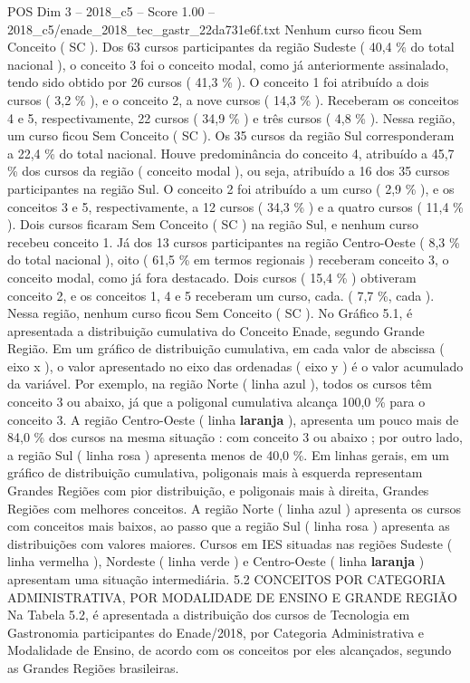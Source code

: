 \begin{textsample}{POS Dim 3 – 2018\_c5 – Score 1.00 – 2018\_c5/enade\_2018\_tec\_gastr\_22da731e6f.txt}
Nenhum curso ficou Sem Conceito ( SC ).
Dos 63 cursos participantes da região Sudeste ( 40,4 \% do total nacional ), o conceito 3 foi o conceito modal, como já anteriormente assinalado, tendo sido obtido por 26 cursos ( 41,3 \% ).
O conceito 1 foi atribuído a dois cursos ( 3,2 \% ), e o conceito 2, a nove cursos ( 14,3 \% ).
Receberam os conceitos 4 e 5, respectivamente, 22 cursos ( 34,9 \% ) e três cursos ( 4,8 \% ).
Nessa região, um curso ficou Sem Conceito ( SC ).
Os 35 cursos da região Sul corresponderam a 22,4 \% do total nacional.
Houve predominância do conceito 4, atribuído a 45,7 \% dos cursos da região ( conceito modal ), ou seja, atribuído a 16 dos 35 cursos participantes na região Sul.
O conceito 2 foi atribuído a um curso ( 2,9 \% ), e os conceitos 3 e 5, respectivamente, a 12 cursos ( 34,3 \% ) e a quatro cursos ( 11,4 \% ).
Dois cursos ficaram Sem Conceito ( SC ) na região Sul, e nenhum curso recebeu conceito 1.
Já dos 13 cursos participantes na região Centro-Oeste ( 8,3 \% do total nacional ), oito ( 61,5 \% em termos regionais ) receberam conceito 3, o conceito modal, como já fora destacado.
Dois cursos ( 15,4 \% ) obtiveram conceito 2, e os conceitos 1, 4 e 5 receberam um curso, cada. ( 7,7 \%, cada ).
Nessa região, nenhum curso ficou Sem Conceito ( SC ).
No Gráfico 5.1, é apresentada a distribuição cumulativa do Conceito Enade, segundo Grande Região.
Em um gráfico de distribuição cumulativa, em cada valor de abscissa ( eixo x ), o valor apresentado no eixo das ordenadas ( eixo y ) é o valor acumulado da variável.
Por exemplo, na região Norte ( linha azul ), todos os cursos têm conceito 3 ou abaixo, já que a poligonal cumulativa alcança 100,0 \% para o conceito 3.
A região Centro-Oeste ( linha \textbf{laranja} ), apresenta um pouco mais de 84,0 \% dos cursos na mesma situação : com conceito 3 ou abaixo ; por outro lado, a região Sul ( linha rosa ) apresenta menos de 40,0 \%.
Em linhas gerais, em um gráfico de distribuição cumulativa, poligonais mais à esquerda representam Grandes Regiões com pior distribuição, e poligonais mais à direita, Grandes Regiões com melhores conceitos.
A região Norte ( linha azul ) apresenta os cursos com conceitos mais baixos, ao passo que a região Sul ( linha rosa ) apresenta as distribuições com valores maiores.
Cursos em IES situadas nas regiões Sudeste ( linha vermelha ), Nordeste ( linha verde ) e Centro-Oeste ( linha \textbf{laranja} ) apresentam uma situação intermediária. 5.2 CONCEITOS POR CATEGORIA ADMINISTRATIVA, POR MODALIDADE DE ENSINO E GRANDE REGIÃO Na Tabela 5.2, é apresentada a distribuição dos cursos de Tecnologia em Gastronomia participantes do Enade/2018, por Categoria Administrativa e Modalidade de Ensino, de acordo com os conceitos por eles alcançados, segundo as Grandes Regiões brasileiras.

\end{textsample}
